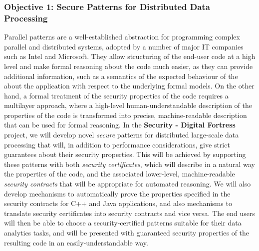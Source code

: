 \documentclass[a4paper,11pt]{article}
\newcommand{\project}[1]{\textbf{#1}\xspace}
\newcommand{\SECURITY}{\project{Security - Digital Fortress}}
\newcommand{\TheProject}{\SECURITY}
\begin{document}
\subsubsection*{Objective 1: Secure Patterns for Distributed Data Processing}
\vspace{-6pt}
Parallel patterns are a well-established abstraction for programming complex parallel and distributed systems, adopted by a number of major IT companies such as Intel and Microsoft. They allow structuring of the end-user code at a high level and make formal reasoning about the code much easier, as they can provide additional information, such as a semantics of the expected behaviour of the about the application with respect to the underlying formal models. On the other hand, a formal treatment of the security properties of the code requires a multilayer approach, where a high-level human-understandable description of the properties of the code is transformed into precise, machine-readable description that can be used for formal reasoning. In the \TheProject{} project, we will develop novel \emph{secure} patterns for distributed large-scale data processing that will, in addition to performance considerations, give strict guarantees about their security properties. This will be achieved by supporting these patterns with both \emph{security certificates}, which will describe in a natural way the properties of the code, and the associated lower-level, machine-readable \emph{security contracts} that will be appropriate for automated reasoning. We will also develop mechanisms to automatically prove the properties specified in the security contracts for C++ and Java applications, and also mechanisms to translate security certificates into security contracts and vice versa. The end users will then be able to choose a security-certified patterns suitable for their data analytics tasks, and will be presented with guaranteed security properties of the resulting code in an easily-understandable way. 
\end{document}
